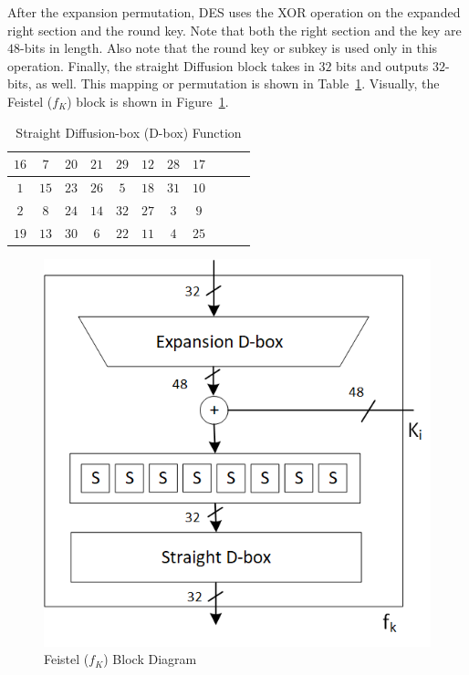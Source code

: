 \documentclass{article}
\begin{document}
After the expansion permutation, DES uses the XOR operation on the
expanded right section and the round key. Note that both the right
section and the key are $48$-bits in length. Also note that the round
key or subkey is used only in this operation.  Finally,
the straight Diffusion block
takes in $32$ bits and outputs $32$-bits, as well.  This mapping or
permutation is shown in Table~\ref{dbox.tbl}.  Visually, the Feistel
($f_K$) block is shown in Figure~\ref{des.png}. 
\begin{table}
  \centering
  \begin{tabular} {|c|c|c|c|c|c|c|c|c|c|c|} \hline
    $16$ & $7$  & $20$ & $21$ & $29$ & $12$ & $28$ & $17$ \\ \hline
    $1$  & $15$ & $23$ & $26$ & $5$  & $18$ & $31$ & $10$ \\ \hline
    $2$  & $8$  & $24$ & $14$ & $32$ & $27$ & $3$  & $9$  \\ \hline
    $19$ & $13$ & $30$ & $6$  & $22$ & $11$ & $4$  & $25$ \\ \hline    
\end{tabular}
\caption{Straight Diffusion-box (D-box) Function}
\label{dbox.tbl}
\end{table}
\begin{figure} [t!]
  \centering
  \includegraphics[scale=0.7]{des.png}
  \caption{Feistel ($f_K$) Block Diagram}
  \label{des.png}
\end{figure}
\end{document}
